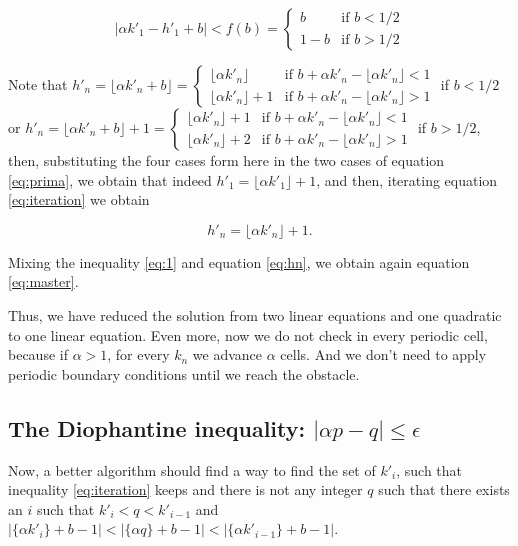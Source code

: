 \documentclass[prl,amsmath,amssymb, twocolumn, showpacs]{revtex4-1}
\begin{document}
\begin{equation}
|\alpha k'_1 -h'_1 + b|< f(b) = \begin{cases} b &\mbox{if } b < 1/2 \\ 
1-b & \mbox{if } b > 1/2 \end{cases} 
\label{eq:prima}
\end{equation}

Note that $h'_n= \lfloor \alpha k'_n +b  \rfloor= \begin{cases} \lfloor \alpha k'_n  \rfloor  &\mbox{if } b+\alpha k'_n-\lfloor \alpha k'_n  \rfloor < 1 \\ 
 \lfloor \alpha k'_n  \rfloor+1  &\mbox{if } b+\alpha k'_n-\lfloor \alpha k'_n  \rfloor > 1 \end{cases}$ if $b<1/2$ or $h'_n= \lfloor \alpha k'_n +b  \rfloor+1= \begin{cases} \lfloor \alpha k'_n  \rfloor+1  &\mbox{if } b+\alpha k'_n-\lfloor \alpha k'_n  \rfloor < 1 \\ 
 \lfloor \alpha k'_n  \rfloor+2  &\mbox{if } b+\alpha k'_n-\lfloor \alpha k'_n  \rfloor > 1 \end{cases}$ if $b>1/2$, then, substituting the four cases form here in the two cases of equation \ref{eq:prima}, we obtain that indeed $h'_1= \lfloor \alpha k'_1  \rfloor+1$, and then,  iterating  equation \ref{eq:iteration} we obtain 

\begin{equation}
 h'_n= \lfloor \alpha k'_n  \rfloor+1.
\label{eq:hn}
\end{equation}
 
Mixing the inequality \ref{eq:1} and equation \ref{eq:hn}, we obtain again equation \ref{eq:master}. 

Thus, we have reduced the solution from two linear equations and one quadratic to one linear equation. Even more, now we do not check in every periodic cell, because if $\alpha >1$, for every $k_n$ we advance $\alpha$ cells. And we don't need to apply periodic boundary conditions until we reach the obstacle. 

\subsection{The Diophantine inequality: $|\alpha p - q|\leq \epsilon$}

Now, a better algorithm should find a way to find the set of $k'_i$, such that inequality \ref{eq:iteration} keeps and there is not any integer $q$ such that there exists an $i$ such that $k'_i<q<k'_{i-1}$ and
$|\{ \alpha  k'_i \}+b -1|<|\{ \alpha  q \}+b -1| <|\{ \alpha  k'_{i-1} \}+b -1|$. 
\end{document}
